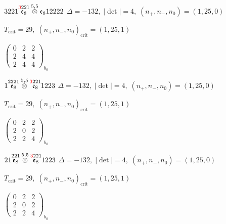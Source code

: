 \documentclass[10pt]{article}
\begin{document}
$3221\overset{\textcolor{red}{3}221}{\mathfrak{e}_8}\overset{5,5}{\otimes}\mathfrak{e}_812222$ \quad $\Delta=-132,\; |\det|=4,\; (n_+,n_-,n_0)=(1,25,0)$

\hspace{1em}$T_{\text{crit}}=29,\; (n_+,n_-,n_0)_{\text{crit}}=(1,25,1)$

\hspace{2em}$\left(\begin{smallmatrix}0 & 2 & 2 \\ 2 & 4 & 4 \\ 2 & 4 & 4\end{smallmatrix}\right)_{\!b_0}$

\smallskip

$1\overset{2221}{\mathfrak{e}_8}\overset{5,5}{\otimes}\overset{\textcolor{red}{3}221}{\mathfrak{e}_8}1223$ \quad $\Delta=-132,\; |\det|=4,\; (n_+,n_-,n_0)=(1,25,0)$

\hspace{1em}$T_{\text{crit}}=29,\; (n_+,n_-,n_0)_{\text{crit}}=(1,25,1)$

\hspace{2em}$\left(\begin{smallmatrix}0 & 2 & 2 \\ 2 & 0 & 2 \\ 2 & 2 & 4\end{smallmatrix}\right)_{\!b_0}$

\smallskip

$21\overset{221}{\mathfrak{e}_8}\overset{5,5}{\otimes}\overset{\textcolor{red}{3}221}{\mathfrak{e}_8}1223$ \quad $\Delta=-132,\; |\det|=4,\; (n_+,n_-,n_0)=(1,25,0)$

\hspace{1em}$T_{\text{crit}}=29,\; (n_+,n_-,n_0)_{\text{crit}}=(1,25,1)$

\hspace{2em}$\left(\begin{smallmatrix}0 & 2 & 2 \\ 2 & 0 & 2 \\ 2 & 2 & 4\end{smallmatrix}\right)_{\!b_0}$

\smallskip
\end{document}
